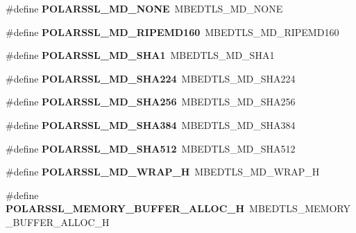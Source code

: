\begin{DoxyCompactItemize}
\item 
\mbox{\label{compat-1_83_8h_aa43a5b39851f0a09471be00055ea5074}} 
\#define {\bfseries P\+O\+L\+A\+R\+S\+S\+L\+\_\+\+M\+D\+\_\+\+N\+O\+NE}~M\+B\+E\+D\+T\+L\+S\+\_\+\+M\+D\+\_\+\+N\+O\+NE
\item 
\mbox{\label{compat-1_83_8h_a402277cbaace94d95459054947ddd4b2}} 
\#define {\bfseries P\+O\+L\+A\+R\+S\+S\+L\+\_\+\+M\+D\+\_\+\+R\+I\+P\+E\+M\+D160}~M\+B\+E\+D\+T\+L\+S\+\_\+\+M\+D\+\_\+\+R\+I\+P\+E\+M\+D160
\item 
\mbox{\label{compat-1_83_8h_adebdb57871e95345175f019bcea37fe8}} 
\#define {\bfseries P\+O\+L\+A\+R\+S\+S\+L\+\_\+\+M\+D\+\_\+\+S\+H\+A1}~M\+B\+E\+D\+T\+L\+S\+\_\+\+M\+D\+\_\+\+S\+H\+A1
\item 
\mbox{\label{compat-1_83_8h_a1df0df45f4445de211514814d74bebd1}} 
\#define {\bfseries P\+O\+L\+A\+R\+S\+S\+L\+\_\+\+M\+D\+\_\+\+S\+H\+A224}~M\+B\+E\+D\+T\+L\+S\+\_\+\+M\+D\+\_\+\+S\+H\+A224
\item 
\mbox{\label{compat-1_83_8h_a4259233647a6e6070f9c7f42c805d633}} 
\#define {\bfseries P\+O\+L\+A\+R\+S\+S\+L\+\_\+\+M\+D\+\_\+\+S\+H\+A256}~M\+B\+E\+D\+T\+L\+S\+\_\+\+M\+D\+\_\+\+S\+H\+A256
\item 
\mbox{\label{compat-1_83_8h_a3a4c6db830d27c5a8b4963c70ceba149}} 
\#define {\bfseries P\+O\+L\+A\+R\+S\+S\+L\+\_\+\+M\+D\+\_\+\+S\+H\+A384}~M\+B\+E\+D\+T\+L\+S\+\_\+\+M\+D\+\_\+\+S\+H\+A384
\item 
\mbox{\label{compat-1_83_8h_a79fc05a8507a5e7dfbe2850e6349a6f4}} 
\#define {\bfseries P\+O\+L\+A\+R\+S\+S\+L\+\_\+\+M\+D\+\_\+\+S\+H\+A512}~M\+B\+E\+D\+T\+L\+S\+\_\+\+M\+D\+\_\+\+S\+H\+A512
\item 
\mbox{\label{compat-1_83_8h_a9add4ca06efa2f32f6bd79d0ee9130a6}} 
\#define {\bfseries P\+O\+L\+A\+R\+S\+S\+L\+\_\+\+M\+D\+\_\+\+W\+R\+A\+P\+\_\+H}~M\+B\+E\+D\+T\+L\+S\+\_\+\+M\+D\+\_\+\+W\+R\+A\+P\+\_\+H
\item 
\mbox{\label{compat-1_83_8h_ab0eba11408c8810b9116225bca801061}} 
\#define {\bfseries P\+O\+L\+A\+R\+S\+S\+L\+\_\+\+M\+E\+M\+O\+R\+Y\+\_\+\+B\+U\+F\+F\+E\+R\+\_\+\+A\+L\+L\+O\+C\+\_\+H}~M\+B\+E\+D\+T\+L\+S\+\_\+\+M\+E\+M\+O\+R\+Y\+\_\+\+B\+U\+F\+F\+E\+R\+\_\+\+A\+L\+L\+O\+C\+\_\+H

\end{DoxyCompactItemize}
